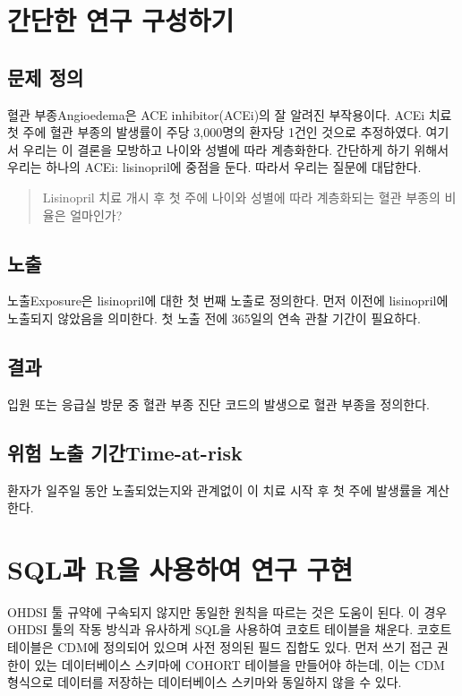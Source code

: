 \documentclass[10.5pt]{book}
\theoremstyle{definition}
\theoremstyle{definition}
\theoremstyle{definition}
\theoremstyle{remark}
\begin{document}
\section{간단한 연구 구성하기}\label{--}

\subsection{문제 정의}\label{-}

혈관 부종Angioedema은 ACE inhibitor(ACEi)의 잘 알려진 부작용이다.
\citep{slater_1988} ACEi 치료 첫 주에 혈관 부종의 발생률이 주당
3,000명의 환자당 1건인 것으로 추정하였다. 여기서 우리는 이 결론을
모방하고 나이와 성별에 따라 계층화한다. 간단하게 하기 위해서 우리는
하나의 ACEi: lisinopril에 중점을 둔다. 따라서 우리는 질문에 대답한다.

\begin{quote}
Lisinopril 치료 개시 후 첫 주에 나이와 성별에 따라 계층화되는 혈관
부종의 비율은 얼마인가?
\end{quote}

\subsection{노출}

노출Exposure은 lisinopril에 대한 첫 번째 노출로 정의한다. 먼저 이전에
lisinopril에 노출되지 않았음을 의미한다. 첫 노출 전에 365일의 연속 관찰
기간이 필요하다.

\subsection{결과}

입원 또는 응급실 방문 중 혈관 부종 진단 코드의 발생으로 혈관 부종을
정의한다.

\subsection{위험 노출 기간Time-at-risk}\label{--time-at-risk}

환자가 일주일 동안 노출되었는지와 관계없이 이 치료 시작 후 첫 주에
발생률을 계산한다.

\section{SQL과 R을 사용하여 연구 구현}\label{sql-r---}

OHDSI 툴 규약에 구속되지 않지만 동일한 원칙을 따르는 것은 도움이 된다.
이 경우 OHDSI 툴의 작동 방식과 유사하게 SQL을 사용하여 코호트 테이블을
채운다. 코호트 테이블은 CDM에 정의되어 있으며 사전 정의된 필드 집합도
있다. 먼저 쓰기 접근 권한이 있는 데이터베이스 스키마에 COHORT 테이블을
만들어야 하는데, 이는 CDM 형식으로 데이터를 저장하는 데이터베이스
스키마와 동일하지 않을 수 있다.
\end{document}
